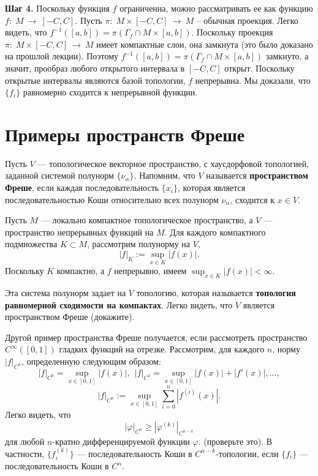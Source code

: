 \documentclass[12pt]{book}
\newcommand{\arrow}{{\:\longrightarrow\:}}
\def\endproof{\hbox{\vrule width 5pt height 5pt depth 0pt}}
\renewcommand{\phi}{\varphi}
\theoremstyle{upshape}
\theoremstyle{generic}
\theoremstyle{upshapenonumber}
\newcommand{\следствие}{%
     \refstepcounter{teorema}
     {\noindent\bf Следствие \thechapter.\arabic{teorema}:\ }}
\newcommand{\пример}{%
     \refstepcounter{teorema}
     {\noindent\bf Пример \thechapter.\arabic{teorema}:\ }}
\newcommand{\лемма}{%
     \refstepcounter{teorema}
     {\noindent\bf Лемма \thechapter.\arabic{teorema}:\ }}
\newcommand{\теорема}{%
     \refstepcounter{teorema}
     {\noindent\bf Теорема \thechapter.\arabic{teorema}:\ }}
\newcommand{\утверждение}{%
     \refstepcounter{teorema}
     {\noindent\bf Утверждение \thechapter.\arabic{teorema}:\ }}
\def\хфилл{\hfill}
\def\ноиндент{\noindent}
\def\бф{\bf}
\begin{document}
\хфилл

\ноиндент
{\бф Шаг 4.} 
Поскольку функция $f$ ограниченна,
можно рассматривать ее как функцию
$f:\; M \arrow [-C, C]$.
Пусть $\pi:\; M\times [-C, C] \arrow M$ --
обычная проекция. Легко видеть, что 
$f^{-1}([a,b])= \pi(\Gamma_f\cap M\times [a,b])$.
Поскольку проекция $\pi:\; M\times [-C, C] \arrow M$
имеет компактные слои, она замкнута (это было
доказано на прошлой лекции). Поэтому  
$f^{-1}([a,b])= \pi(\Gamma_f\cap M\times [a,b])$
замкнуто, а значит, прообраз любого открытого
интервала в $[-C, C]$ открыт. Поскольку открытые
интервалы являются базой топологии, $f$
непрерывна. Мы доказали, что $\{f_i\}$ 
равномерно сходится
к непрерывной функции. \endproof


\section{Примеры пространств Фреше}


Пусть $V$ --- топологическое векторное пространство,
с хаусдорфовой топологией, заданной системой
полунорм $\{\nu_\alpha\}$. Напомним, что
$V$ называется {\бф пространством Фреше},
если каждая последовательность $\{x_i\}$,
которая является последовательностью Коши
относительно всех полунорм $\nu_\alpha$,
сходится к $x\in V$.

Пусть $M$ --- локально компактное топологическое
пространство, а $V$ --- пространство непрерывных
функций на $M$. Для каждого компактного подмножества
$K \subset M$, рассмотрим полунорму на $V$,
\[
|f|_K:=\sup_{x\in K} |f(x)|.
\]
Поскольку $K$ компактно, а $f$ непрерывно,
имеем $\sup_{x\in K} |f(x)|< \infty$.

Эта система полунорм задает на $V$ топологию,
которая называется
{\бф топология равномерной сходимости на компактах}. 
Легко видеть, что $V$ является пространством Фреше
(докажите).

Другой пример пространства Фреше получается,
если рассмотреть пространство $C^\infty([0,1])$
гладких функций на отрезке. Рассмотрим, для каждого $n$,
норму $|f|_{C^n}$, определенную следующим образом:
\[ |f|_{C^0}= \sup_{x\in [0,1]} |f(x)|, \ \ 
|f|_{C^1}= \sup_{x\in [0,1]} |f(x)|+ |f'(x)|, ...,
\] 
\[
|f|_{C^n}:= \sup_{x\in [0,1]} \sum_{i=0}^n |f^{(i)}(x)| .
\]
Легко видеть, что
\[
|\phi|_{C^n} \geq |\phi^{(k)}|_{C^{n-k}}
\]
для любой $n$-кратно дифференцируемой функции $\phi$.
(проверьте это). В частности, $\{f_i^{(k)}\}$ --- последовательность
Коши в $C^{n-k}$-топологии, если $\{f_i\}$ --- последовательность
Коши в $C^n$.
\end{document}
